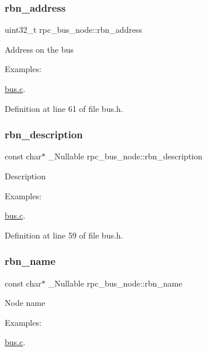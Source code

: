 \subsubsection{\texorpdfstring{rbn\+\_\+address}{rbn\_address}}
{\footnotesize\ttfamily uint32\+\_\+t rpc\+\_\+bus\+\_\+node\+::rbn\+\_\+address}

Address on the bus \begin{Desc}
\item[Examples\+: ]\par
\hyperlink{bus_8c-example}{bus.\+c}.\end{Desc}


Definition at line 61 of file bus.\+h.

\mbox{\label{structrpc__bus__node_af5d23beee7c50520e7235f0c922fafb1}} 
\subsubsection{\texorpdfstring{rbn\+\_\+description}{rbn\_description}}
{\footnotesize\ttfamily const char$\ast$ \+\_\+\+Nullable rpc\+\_\+bus\+\_\+node\+::rbn\+\_\+description}

Description \begin{Desc}
\item[Examples\+: ]\par
\hyperlink{bus_8c-example}{bus.\+c}.\end{Desc}


Definition at line 59 of file bus.\+h.

\mbox{\label{structrpc__bus__node_a9afbf9a155ae01c1c47dc210a8334022}} 
\subsubsection{\texorpdfstring{rbn\+\_\+name}{rbn\_name}}
{\footnotesize\ttfamily const char$\ast$ \+\_\+\+Nullable rpc\+\_\+bus\+\_\+node\+::rbn\+\_\+name}

Node name \begin{Desc}
\item[Examples\+: ]\par
\hyperlink{bus_8c-example}{bus.\+c}.\end{Desc}


